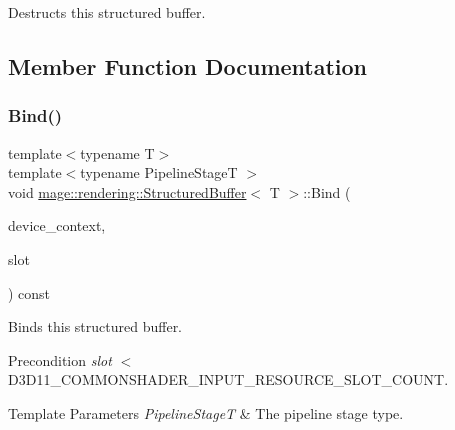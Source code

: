 Destructs this structured buffer. 

\subsection{Member Function Documentation}
\mbox{\label{classmage_1_1rendering_1_1_structured_buffer_aeef55c61fc5331b08c3ae2cba8f8de64}} 
\subsubsection{\texorpdfstring{Bind()}{Bind()}}
{\footnotesize\ttfamily template$<$typename T$>$ \\
template$<$typename Pipeline\+StageT $>$ \\
void \mbox{\hyperlink{classmage_1_1rendering_1_1_structured_buffer}{mage\+::rendering\+::\+Structured\+Buffer}}$<$ T $>$\+::Bind (\begin{DoxyParamCaption}\item[{I\+D3\+D11\+Device\+Context \&}]{device\+\_\+context,  }\item[{\mbox{\hyperlink{namespacemage_a41c104c036fba3756a74e19f793eeaa1}{U32}}}]{slot }\end{DoxyParamCaption}) const\hspace{0.3cm}{\ttfamily [noexcept]}}

Binds this structured buffer.

\begin{DoxyPrecond}{Precondition}
{\itshape slot} $<$ {\ttfamily D3\+D11\+\_\+\+C\+O\+M\+M\+O\+N\+S\+H\+A\+D\+E\+R\+\_\+\+I\+N\+P\+U\+T\+\_\+\+R\+E\+S\+O\+U\+R\+C\+E\+\_\+\+S\+L\+O\+T\+\_\+\+C\+O\+U\+NT}. 
\end{DoxyPrecond}

\begin{DoxyTemplParams}{Template Parameters}
{\em Pipeline\+StageT} & The pipeline stage type. \\
\hline
\end{DoxyTemplParams}

